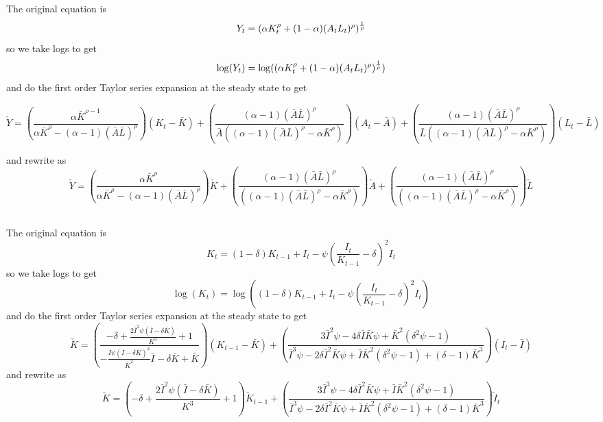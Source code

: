 \documentclass[11pt]{amsart}
\begin{document}
\subsection{}
The original equation is
\[
Y_t = (\alpha K_t^{\rho} + (1-\alpha)(A_t L_t)^{\rho})^{1 \over \rho}
\]
so we take logs to get
\[
\log(Y_t) = \log((\alpha K_t^{\rho} + (1-\alpha)(A_t L_t)^{\rho})^{1 \over \rho})
\]
and do the first order Taylor series expansion at the steady state to get
\begin{tiny}
\[
\check{Y}  = \left(\frac{\alpha  \bar{K}^{\rho -1}}{\alpha  \bar{K}^{\rho }-(\alpha -1) (\bar{A} \bar{L})^{\rho }}\right) (K_t - \bar{K}) + \left(\frac{(\alpha -1) (\bar{A} \bar{L})^{\rho }}{\bar{A} \left((\alpha -1) (\bar{A} \bar{L})^{\rho }-\alpha  \bar{K}^{\rho }\right)}\right) (A_t - \bar{A}) + \left(\frac{(\alpha -1) (\bar{A} \bar{L})^{\rho }}{\bar{L} \left((\alpha -1) (\bar{A} \bar{L})^{\rho }-\alpha  \bar{K}^{\rho }\right)}\right)(L_t - \bar{L})
\]
\end{tiny}
and rewrite as
\[
\check{Y}  = \left(\frac{\alpha  \bar{K}^{\rho}}{\alpha  \bar{K}^{\rho }-(\alpha -1) (\bar{A} \bar{L})^{\rho }}\right) \check{K} + \left(\frac{(\alpha -1) (\bar{A} \bar{L})^{\rho }}{\left((\alpha -1) (\bar{A} \bar{L})^{\rho }-\alpha  \bar{K}^{\rho }\right)}\right) \check{A} + \left(\frac{(\alpha -1) (\bar{A} \bar{L})^{\rho }}{\left((\alpha -1) (\bar{A} \bar{L})^{\rho }-\alpha  \bar{K}^{\rho }\right)}\right) \check{L}
\]


\subsection{}
The original equation is
\[
K_t = (1-\delta) K_{t-1} + I_t - \psi \left(\frac{I_t}{K_{t-1}} - \delta \right)^2 I_t
\]
so we take logs to get
\[
\log(K_t) = \log((1-\delta) K_{t-1} + I_t - \psi \left(\frac{I_t}{K_{t-1}} - \delta \right)^2 I_t)
\]
and do the first order Taylor series expansion at the steady state to get
\begin{dmath*}
\check{K} = \left( \frac{-\delta +\frac{2 \bar{I}^2 \psi  (\bar{I}-\delta  \bar{K})}{K^3}+1}{-\frac{\bar{I} \psi  (\bar{I}-\delta  \bar{K})^2}{\bar{K}^2}\bar{I}-\delta  \bar{K}+\bar{K}} \right) (K_{t-1} - \bar{K}) + \left( \frac{3 \bar{I}^2 \psi -4 \delta  \bar{I} \bar{K} \psi +\bar{K}^2 \left(\delta ^2 \psi -1\right)}{\bar{I}^3 \psi -2 \delta  \bar{I}^2 \bar{K} \psi +\bar{I} \bar{K}^2 \left(\delta ^2 \psi -1\right)+(\delta -1) \bar{K}^3} \right) (I_t - \bar{I})
\end{dmath*}
and rewrite as
\begin{dmath*}
\check{K} = \left( -\delta +\frac{2 \bar{I}^2 \psi  (\bar{I}-\delta  \bar{K})}{K^3}+1 \right) \check{K}_{t-1} + \left( \frac{3 \bar{I}^3 \psi -4 \delta  \bar{I}^2 \bar{K} \psi + \bar{I} \bar{K}^2 \left(\delta ^2 \psi -1\right)}{\bar{I}^3 \psi -2 \delta  \bar{I}^2 \bar{K} \psi +\bar{I} \bar{K}^2 \left(\delta ^2 \psi -1 \right)+(\delta -1) \bar{K}^3} \right) \check{I}_t
\end{dmath*}
\end{document}
